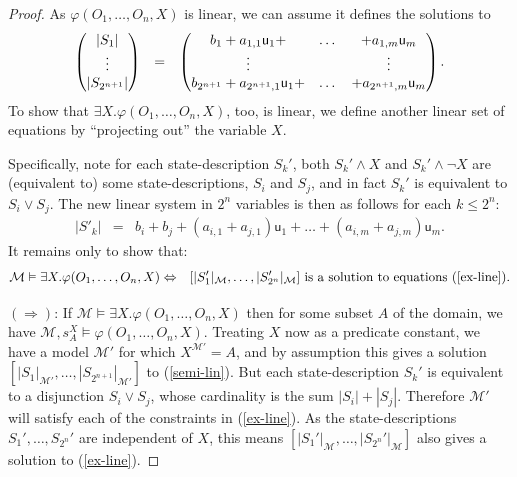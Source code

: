 \documentclass[12pt,oneside,reqno]{amsart}
\theoremstyle{definition}
\begin{document}
\begin{proof} As $\varphi(O_1,\dots,O_n,X)$ is linear, we can assume it defines the solutions to  \vspace{0.5ex} \begin{equation}
 \begin{pmatrix}
\;|S_1|\;  \\
\vdots  \\
|S_{2^{n+1}}|  
\end{pmatrix} \hspace{.1in}= \hspace{.1in}
\begin{pmatrix}
b_1 + a_{1,1}\mathsf{u}_1 + & \dots  & + a_{1,m}\mathsf{u}_m  \\
 \vdots & & \vdots \\
b_{2^{n+1}} + a_{2^{n+1},1}\mathsf{u}_1 + & \dots & +  a_{2^{n+1},m}\mathsf{u}_m
\end{pmatrix}. \label{semi-lin}
\end{equation}\vspace{0.5ex} To show that $\exists X. \varphi(O_1,\dots,O_n,X)$, too, is linear, we define another linear set of equations by ``projecting out'' the variable $X$. 

\vspace{1ex}

Specifically, note for each state-description $S_k'$, both $S_k' \wedge X$ and $S_k' \wedge \neg X$ are (equivalent to) some state-descriptions, $S_i$ and $S_j$, and in fact $S_k'$ is equivalent to $S_i \vee S_j$. The new linear system in $2^n$ variables is then as follows for each $k\leq 2^n$: \begin{eqnarray} |S'_k| & = &  b_i + b_j + (a_{i,1}+a_{j,1})\mathsf{u}_1+ \dots + (a_{i,m} + a_{j,m})\mathsf{u}_m . \label{ex-line}\end{eqnarray} It remains only to show that:\vspace{0.5ex} \begin{eqnarray}
   \mathcal{M} \vDash \exists X. \varphi(O_1,\dots,O_n,X) 
   & \Leftrightarrow & [|S_1'|_{\mathcal{M}},\dots,|S_{2^n}'|_{\mathcal{M}}] \mbox{ is a solution to equations }(\ref{ex-line}).\vspace{1ex} \nonumber
\end{eqnarray} 

$(\Rightarrow)$: If $\mathcal{M} \vDash \exists X. \varphi(O_1,\dots,O_n,X)$ then for some subset $A$ of the domain, we have $\mathcal{M},s^X_A \vDash \varphi(O_1,\dots,O_n,X)$. Treating $X$ now as a predicate constant, we have a model $\mathcal{M}'$ for which $X^{\mathcal{M}'}=A$, and by assumption this gives a solution $[|S_1|_{\mathcal{M}'},\dots,|S_{2^{n+1}}|_{\mathcal{M}'}]$ to (\ref{semi-lin}). But each state-description $S_k'$ is equivalent to a disjunction $S_i \vee S_j$, whose cardinality is the sum $|S_i|+|S_j|$. Therefore $\mathcal{M}'$ will satisfy each of the constraints in (\ref{ex-line}). As the state-descriptions $S_1',\dots,S_{2^n}'$ are independent of $X$, this means  $[|S_1'|_{\mathcal{M}},\dots,|S_{2^n}'|_{\mathcal{M}}]$ also gives a solution to (\ref{ex-line}).


\end{proof}
\end{document}
